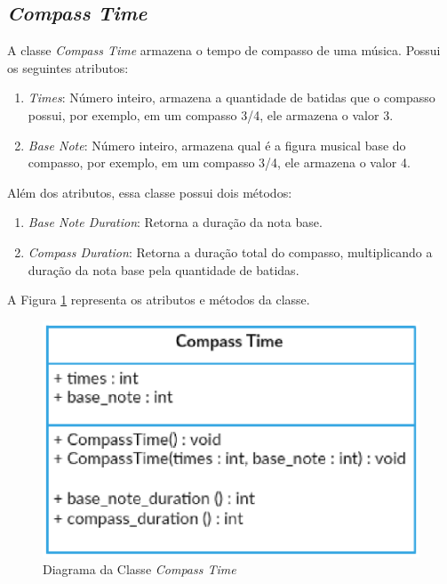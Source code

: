     \subsection[\textit{Compass Time}]{\textit{Compass Time}}

      A classe \textit{Compass Time} armazena o tempo de compasso de uma música. Possui os seguintes atributos:

      \begin{enumerate}
        \item \textit{Times}: Número inteiro, armazena a quantidade de batidas que o compasso possui, por exemplo, em um compasso 3/4, ele armazena o valor 3.
        \item \textit{Base Note}: Número inteiro, armazena qual é a figura musical base do compasso, por exemplo, em um compasso 3/4, ele armazena o valor 4.
      \end{enumerate}

      Além dos atributos, essa classe possui dois métodos:

      \begin{enumerate}
        \item \textit{Base Note Duration}: Retorna a duração da nota base.
        \item \textit{Compass Duration}: Retorna a duração total do compasso, multiplicando a duração da nota base pela quantidade de batidas.
      \end{enumerate}


      A Figura \ref{compasstimeclass} representa os atributos e métodos da classe.

      \begin{figure}[htb]
        \centering
        \includegraphics[scale=0.7]{figuras/compasstimeclass.eps}
        \caption{Diagrama da Classe \textit{Compass Time}}
        \label{compasstimeclass}
      \end{figure}


